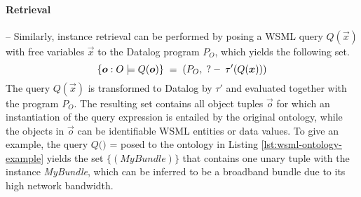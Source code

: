 \paragraph{Retrieval} -- Similarly, instance retrieval can be
performed by posing a WSML query $Q(\vec{x})$ with free variables
$\vec{x}$ to the Datalog program $P_O$, which yields the following
set. \compress
\begin{displaymath}
   \{\vec{o} : O \models Q(\vec{o})\} \; = \; (P_O, \qury
   \tau'(Q(\vec{x}))) \compress
\end{displaymath}
The query $Q(\vec{x})$ is transformed to Datalog by $\tau'$ and
evaluated together with the program $P_O$. The resulting set
contains all object tuples $\vec{o}$ for which an instantiation of
the query expression is entailed by the original ontology, while
the objects in $\vec{o}$ can be identifiable WSML entities or data
values. To give an
example, the query \thinspace $Q($$)$ = %
  
\thinspace posed to the ontology in Listing
\ref{lst:wsml-ontology-example} yields the set $\{
(\textit{MyBundle}) \}$ that contains one unary tuple with the
instance \textit{MyBundle}, which can be inferred to be a
broadband bundle due to its high network bandwidth.

%
